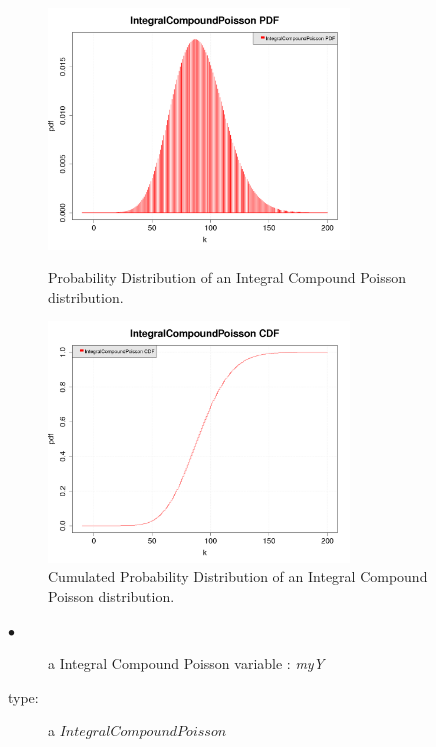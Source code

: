 \begin{figure}[Hhbtp]
  \begin{minipage}{8cm}
    \begin{center}
      \includegraphics[width=8cm]{ICP_PDF.png} 
      \caption{Probability Distribution of an Integral Compound Poisson distribution.}
      \label{ICP_PDF}
    \end{center}
  \end{minipage}
  \hfill
  \begin{minipage}{8cm}
    \begin{center}
      \includegraphics[width=8cm]{ICP_CDF.png} 
      \caption{Cumulated Probability Distribution of an Integral Compound Poisson distribution.}
      \label{ICP_CDF}
    \end{center}
  \end{minipage}
\end{figure}






\espace

{
  \begin{description}
  \item[$\bullet$] a Integral Compound Poisson variable  : {\itshape myY}
  \item[type:] a $IntegralCompoundPoisson$
  \end{description}
}

